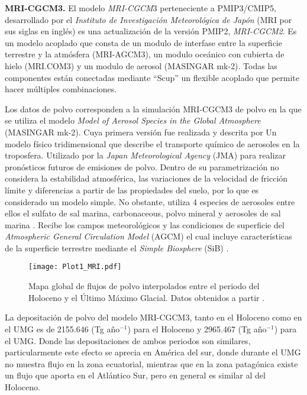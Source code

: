  {\bf MRI-CGCM3.} El modelo \textit{MRI-CGCM}3 perteneciente a PMIP3/CMIP5, desarrollado por el \textit{Instituto de Investigación Meteorológica de Jap\'on} (MRI por sus siglas en inglés) es una actualización de la versión PMIP2, \textit{MRI-CGCM2}. Es un modelo acoplado que consta de un modulo de interfase entre la superficie terrestre y la atmósfera (MRI-AGCM3), un modulo oceánico con cubierta de hielo (MRI.COM3) y un modulo de aerosol (MASINGAR mk-2). Todas las componentes están conectadas mediante ``Scup'' un flexible acoplado que permite hacer múltiples combinaciones.
 
 Los datos de polvo corresponden a la simulación MRI-CGCM3 de polvo en la que se utiliza el modelo \textit{Model of Aerosol Species in the Global Atmosphere} (MASINGAR mk-2). Cuya primera versión fue realizada y descrita por \cite{2003} Un modelo físico tridimensional que describe el transporte químico de aerosoles en la troposfera. Utilizado por la \textit{Japan Meteorological Agency} (JMA) para realizar pronósticos futuros de emisiones de polvo. Dentro de su parametrización no considera la estabilidad atmosférica, las variaciones de la velocidad de fricción límite y diferencias a partir de las propiedades del suelo, por lo que es considerado un modelo simple. No obstante, utiliza 4 especies de aerosoles entre ellos el sulfato de sal marina, carbonaceous, polvo mineral y aerosoles de sal marina \citep{2003}. Recibe los campos meteorológicos y las condiciones de superficie del \textit{Atmospheric General Circulation Model} (AGCM) el cual incluye características de la superficie terrestre mediante el \textit{Simple Biosphere} (SiB) \citep{yukimoto2012new}.  

 \begin{figure}[H]
\centering
  \texttt{[image: Plot1\_MRI.pdf]}
  \caption[Flujos de polvo \cite{yukimoto2012new}]{Mapa global de flujos de polvo interpolados entre el periodo del Holoceno y el \'Ultimo M\'aximo Glacial. Datos obtenidos a partir \cite{yukimoto2012new}.}
  \label{fig:MRI}
\end{figure}

La depositación de polvo del modelo MRI-CGCM3, tanto en el Holoceno como en el UMG es de 2155.646  (Tg año$^{-1}$) para el Holoceno y 2965.467  (Tg año$^{-1}$) para el UMG. Donde las depositaciones de ambos periodos son similares, particularmente este efecto se aprecia en América del sur, donde durante el UMG no muestra flujo en la zona ecuatorial, mientras que en la zona patagónica existe un flujo que aporta en el Atlántico Sur, pero en general es similar al del Holoceno. 

